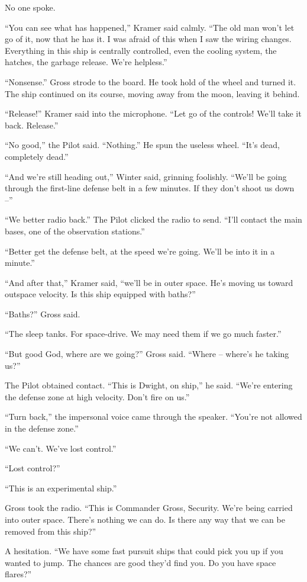 \documentclass[12pt,a5paper]{book}
\newcommand{\storybreak}{%
  \par\vspace{0.6\baselineskip}
  \begin{center}\color{coveraccent}\small *\enspace *\enspace *\end{center}
  \vspace{0.3\baselineskip}\noindent\ignorespaces
}
\begin{document}
No one spoke.

“You can see what has happened,” Kramer said calmly. “The old man won't let go of it, now that he has it. I was afraid of this when I saw the wiring changes. Everything in this ship is centrally controlled, even the cooling system, the hatches, the garbage release. We're helpless.”

“Nonsense.” Gross strode to the board. He took hold of the wheel and turned it. The ship continued on its course, moving away from the moon, leaving it behind.

“Release!” Kramer said into the microphone. “Let go of the controls! We'll take it back. Release.”

“No good,” the Pilot said. “Nothing.” He spun the useless wheel. “It's dead, completely dead.”

“And we're still heading out,” Winter said, grinning foolishly. “We'll be going through the first-line defense belt in a few minutes. If they don't shoot us down –”

“We better radio back.” The Pilot clicked the radio to send. “I'll contact the main bases, one of the observation stations.”

“Better get the defense belt, at the speed we're going. We'll be into it in a minute.”

“And after that,” Kramer said, “we'll be in outer space. He's moving us toward outspace velocity. Is this ship equipped with baths?”

“Baths?” Gross said.

“The sleep tanks. For space-drive. We may need them if we go much faster.”

“But good God, where are we going?” Gross said. “Where – where's he taking us?”

\storybreak
The Pilot obtained contact. “This is Dwight, on ship,” he said. “We're entering the defense zone at high velocity. Don't fire on us.”

“Turn back,” the impersonal voice came through the speaker. “You're not allowed in the defense zone.”

“We can't. We've lost control.”

“Lost control?”

“This is an experimental ship.”

Gross took the radio. “This is Commander Gross, Security. We're being carried into outer space. There's nothing we can do. Is there any way that we can be removed from this ship?”

A hesitation. “We have some fast pursuit ships that could pick you up if you wanted to jump. The chances are good they'd find you. Do you have space flares?”
\end{document}
